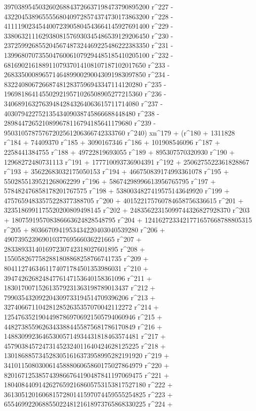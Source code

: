        397038954503260268843726637198473790895200 r^227 - 
       432204538965555680409728574374730173863200 r^228 - 
       411119023454400723905804543664145927691400 r^229 - 
       338063211162938081576930345486539129206450 r^230 - 
       237259926855204567487324469225486222383350 r^231 - 
       139968070735504760061079294485185410205100 r^232 - 
       68169021618891107937014108107187102017650 r^233 - 
       26833500089657146489900290043091983097850 r^234 - 
       8322408067266874812837596943347114120280 r^235 - 
       1969818641455029219571026508905277215360 r^236 - 
       340689163276394842843264063615711714080 r^237 - 
       40307942275213543409038745866688448480 r^238 - 
       2898447265210899678116794185641179680 r^239 - 
       95031057875767202561206366742333760 r^240) xn^179 + (r^180 + 
       1311828 r^184 + 74409370 r^185 + 3090167346 r^186 + 
       101908546096 r^187 + 2258441384755 r^188 + 
       49722819693055 r^189 + 895307570320930 r^190 + 
       12968272480731113 r^191 + 177710093736904391 r^192 + 
       2506275522361828867 r^193 + 35622683032175050153 r^194 + 
       466750839174993361078 r^195 + 5502855139521268062299 r^196 + 
       58674298996613956765795 r^197 + 
       578482476858178201767575 r^198 + 
       5380034827419575143649920 r^199 + 
       47576594833575228377388705 r^200 + 
       401522175760784658756336615 r^201 + 
       3235186991175520200809498145 r^202 + 
       24835622315099744326827928370 r^203 + 
       180759195708386663624828548795 r^204 + 
       1241627233421771657668788805315 r^205 + 
       8036670941953434220403040539280 r^206 + 
       49073952396901037769566036221665 r^207 + 
       283389331401697230742318027601895 r^208 + 
       1550582677582881808868258766741735 r^209 + 
       8041127463461174071784501353986031 r^210 + 
       39474262682484776147153640158361096 r^211 + 
       183017007152613579231363198789013437 r^212 + 
       799035432092204309733194514709396206 r^213 + 
       3274066711042812852635357070042112272 r^214 + 
       12547635219044987869706921505794060946 r^215 + 
       44827385596263433884455875681786170849 r^216 + 
       148830992364653005714934431818463574481 r^217 + 
       457903845724731452324011640424628125225 r^218 + 
       1301868857345283051616373958995282191920 r^219 + 
       3410115080300614588806065860175027864979 r^220 + 
       8201671253857439866764190487841197069475 r^221 + 
       18040844091426276592168605753153817527180 r^222 + 
       36130512016068157280141597074459555254825 r^223 + 
       65546992206885502248121618973765868330225 r^224 + 
